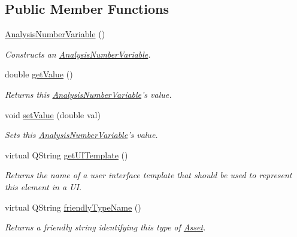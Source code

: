 \subsection*{Public Member Functions}
\begin{DoxyCompactItemize}
\item 
\hyperlink{class_picto_1_1_analysis_number_variable_a2863252abbc251d6dfd33935aea32ecc}{Analysis\-Number\-Variable} ()
\begin{DoxyCompactList}\small\item\em Constructs an \hyperlink{class_picto_1_1_analysis_number_variable}{Analysis\-Number\-Variable}. \end{DoxyCompactList}\item 
\hypertarget{class_picto_1_1_analysis_number_variable_a0abcddee9471e6bebecf06a1379ed013}{double \hyperlink{class_picto_1_1_analysis_number_variable_a0abcddee9471e6bebecf06a1379ed013}{get\-Value} ()}\label{class_picto_1_1_analysis_number_variable_a0abcddee9471e6bebecf06a1379ed013}

\begin{DoxyCompactList}\small\item\em Returns this \hyperlink{class_picto_1_1_analysis_number_variable}{Analysis\-Number\-Variable}'s value. \end{DoxyCompactList}\item 
\hypertarget{class_picto_1_1_analysis_number_variable_a4428da5f29f42e9be3c1c5a3c8777982}{void \hyperlink{class_picto_1_1_analysis_number_variable_a4428da5f29f42e9be3c1c5a3c8777982}{set\-Value} (double val)}\label{class_picto_1_1_analysis_number_variable_a4428da5f29f42e9be3c1c5a3c8777982}

\begin{DoxyCompactList}\small\item\em Sets this \hyperlink{class_picto_1_1_analysis_number_variable}{Analysis\-Number\-Variable}'s value. \end{DoxyCompactList}\item 
\hypertarget{class_picto_1_1_analysis_number_variable_a08bdb73dacf4d9f48f2650db3bcea64c}{virtual Q\-String \hyperlink{class_picto_1_1_analysis_number_variable_a08bdb73dacf4d9f48f2650db3bcea64c}{get\-U\-I\-Template} ()}\label{class_picto_1_1_analysis_number_variable_a08bdb73dacf4d9f48f2650db3bcea64c}

\begin{DoxyCompactList}\small\item\em Returns the name of a user interface template that should be used to represent this element in a U\-I. \end{DoxyCompactList}\item 
virtual Q\-String \hyperlink{class_picto_1_1_analysis_number_variable_ad11a9471bdb19e88dd5d9da2dc46f6a0}{friendly\-Type\-Name} ()
\begin{DoxyCompactList}\small\item\em Returns a friendly string identifying this type of \hyperlink{class_picto_1_1_asset}{Asset}. \end{DoxyCompactList}\end{DoxyCompactItemize}
